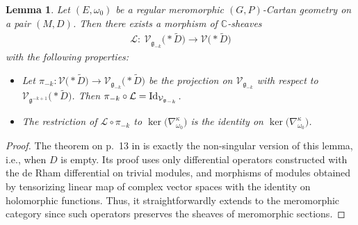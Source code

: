 \documentclass[pdftex]{sigma}
\numberwithin{equation}{section}
\newtheorem{Lemma}[Theorem]{Lemma}
\begin{document}
\begin{Lemma}\label{caractersiticparabolic} Let $(E,\omega_0)$ be a regular meromorphic $(G,P)$-Cartan geometry on a pair $(M,D)$. Then there exists a morphism of $\mathbb{C}$-sheaves
\begin{gather*}%
 \mathcal{L} \colon\ \mathcal{V}_{\mathfrak{g}_{-k}}\bigl(* \tilde{D}\bigr) \longrightarrow \mathcal{V}\bigl(* \tilde{D}\bigr) \end{gather*}
 with the following properties:
\begin{itemize}\itemsep=0pt
 \item[$(i)$] Let $\pi_{-k}\colon \mathcal{V}\bigl(* \tilde{D}\bigr) \longrightarrow \mathcal{V}_{\mathfrak{g}_{-k}}\bigl(* \tilde{D}\bigr)$ be the projection on $\mathcal{V}_{\mathfrak{g}_{-k}}$ with respect to $\mathcal{V}_{\mathfrak{g}^{-k+1}}\bigl(* \tilde{D}\bigr)$. Then $\pi_{-k}\circ \mathcal{L} = {\rm Id}_{\mathcal{V}_{\mathfrak{g}_{-k}}}$.
\item[$(ii)$] The restriction of $\mathcal{L}\circ \pi_{-k}$ to $\ker\big(\nabla^\kappa_{\omega_0}\big)$ is the identity on $\ker\big(\nabla^\kappa_{\omega_0}\big)$.
\end{itemize}\end{Lemma}
\begin{proof} The theorem on p.~13 in \cite{Cap4} is exactly the non-singular version of this lemma, i.e., when $D$ is empty. Its proof uses only differential operators constructed with the de Rham differential on trivial modules, and morphisms of modules obtained by tensorizing linear map of complex vector spaces with the identity on holomorphic functions. Thus, it straightforwardly extends to the meromorphic category since such operators preserves the sheaves of meromorphic sections. \end{proof}
\end{document}
